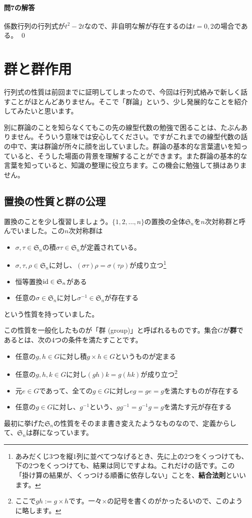 \paragraph{問7の解答}
係数行列の行列式が$t^2 - 2t$なので、非自明な解が存在するのは$t = 0, 2$の場合である。 \qed

\section{群と群作用}

行列式の性質は前回までに証明してしまったので、今回は行列式絡みで新しく話すことがほとんどありません。そこで「群論」という、少し発展的なことを紹介してみたいと思います。

別に群論のことを知らなくてもこの先の線型代数の勉強で困ることは、たぶんありません。そういう意味では安心してください。ですがこれまでの線型代数の話の中で、実は群論が所々に顔を出していました。群論の基本的な言葉遣いを知っていると、そうした場面の背景を理解することができます。また群論の基本的な言葉を知っていると、知識の整理に役立ちます。この機会に勉強して損はありません。

\subsection{置換の性質と群の公理}

置換のことを少し復習しましょう。$\{1, 2, \ldots, n\}$の置換の全体$\mathfrak{S}_n$を$n$次対称群と呼んでいました。この$n$次対称群は
\begin{itemize}
\item $\sigma, \tau \in \mathfrak{S}_n$の積$\sigma \tau \in \mathfrak{S}_n$が定義されている。
\item $\sigma, \tau, \rho \in \mathfrak{S}_n$に対し、$(\sigma \tau)\rho = \sigma (\tau \rho)$が成り立つ\footnote{あみだくじ$3$つを縦$1$列に並べてつなげるとき、先に上の$2$つをくっつけても、下の$2$つをくっつけても、結果は同じですよね。これだけの話です。この「掛け算の結果が、くっつける順番に依存しない」ことを、\textbf{結合法則}といいます。}
\item 恒等置換$\operatorname{id} \in \mathfrak{S}_n$がある
\item 任意の$\sigma \in \mathfrak{S}_n$に対し$\sigma^{-1} \in \mathfrak{S}_n$が存在する
\end{itemize}
という性質を持っていました。

この性質を一般化したものが「群 (group)」と呼ばれるものです。集合$G$が\textbf{群}であるとは、次の$4$つの条件を満たすことです。
\begin{itemize}
\item 任意の$g, h \in G$に対し積$g \times h \in G$というものが定まる
\item 任意の$g, h, k \in G$に対し$(gh)k = g(hk)$が成り立つ\footnote{ここで$gh := g \times h$です。一々$\times$の記号を書くのがかったるいので、このように略します。}
\item 元$e \in G$であって、全ての$g \in G$に対し$eg = ge = g$を満たすものが存在する
\item 任意の$g \in G$に対し、$g^{-1}$という、$g g^{-1} = g^{-1} g = g$を満たす元が存在する
\end{itemize}
最初に挙げた$\mathfrak{S}_n$の性質をそのまま書き変えたようなものなので、定義からして、$\mathfrak{S}_n$は群になっています。

